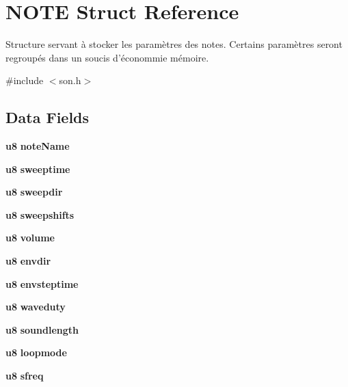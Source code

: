 \section{NOTE Struct Reference}
\label{struct_n_o_t_e}


Structure servant à stocker les paramètres des notes. Certains paramètres seront regroupés dans un soucis d'économmie mémoire.  




{\ttfamily \#include $<$son.h$>$}

\subsection*{Data Fields}
\begin{DoxyCompactItemize}
\item 
{\bf u8} {\bfseries noteName}\label{struct_n_o_t_e_ac5fa36f65680a3df546afbeccc37c58b}

\item 
{\bf u8} {\bfseries sweeptime}\label{struct_n_o_t_e_a4708b88e02269a7aad6ff91dc9b1c3ba}

\item 
{\bf u8} {\bfseries sweepdir}\label{struct_n_o_t_e_a463b57f7562fe226b9697405e3f40241}

\item 
{\bf u8} {\bfseries sweepshifts}\label{struct_n_o_t_e_acf406dc5d0700393272f492fc4599cd6}

\item 
{\bf u8} {\bfseries volume}\label{struct_n_o_t_e_a8cba4ecf2fd0204159e09783bac5ab83}

\item 
{\bf u8} {\bfseries envdir}\label{struct_n_o_t_e_ad007841b84a673b4d3f53f8a09b48347}

\item 
{\bf u8} {\bfseries envsteptime}\label{struct_n_o_t_e_a13f6e149f5f9d51f52056a37f8211156}

\item 
{\bf u8} {\bfseries waveduty}\label{struct_n_o_t_e_ad25096be58bba2ce4a951a1cee873791}

\item 
{\bf u8} {\bfseries soundlength}\label{struct_n_o_t_e_a95a669db24a383bd5d83f637e4bc9f0c}

\item 
{\bf u8} {\bfseries loopmode}\label{struct_n_o_t_e_a8cbe33bff0d7c544428e55850ea1bba9}

\item 
{\bf u8} {\bfseries sfreq}\label{struct_n_o_t_e_a67f6bb7c31331b3aa93f73ba4f164e54}


\end{DoxyCompactItemize}
